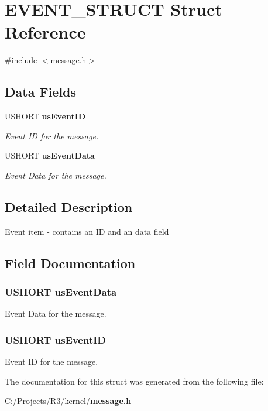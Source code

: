 \section{EVENT\_\-STRUCT Struct Reference}
\label{struct_e_v_e_n_t___s_t_r_u_c_t}


{\ttfamily \#include $<$message.h$>$}\subsection*{Data Fields}
\begin{DoxyCompactItemize}
\item 
USHORT {\bf usEventID}
\begin{DoxyCompactList}\small\item\em Event ID for the message. \item\end{DoxyCompactList}\item 
USHORT {\bf usEventData}
\begin{DoxyCompactList}\small\item\em Event Data for the message. \item\end{DoxyCompactList}\end{DoxyCompactItemize}


\subsection{Detailed Description}
Event item -\/ contains an ID and an data field 

\subsection{Field Documentation}
\subsubsection[{usEventData}]{\setlength{\rightskip}{0pt plus 5cm}USHORT {\bf usEventData}}\label{struct_e_v_e_n_t___s_t_r_u_c_t_a17e1b47a4cec01fd952ce8fca6153510}


Event Data for the message. 
\subsubsection[{usEventID}]{\setlength{\rightskip}{0pt plus 5cm}USHORT {\bf usEventID}}\label{struct_e_v_e_n_t___s_t_r_u_c_t_a31f5f42219a8b4c351cf16734572e0a4}


Event ID for the message. 

The documentation for this struct was generated from the following file:\begin{DoxyCompactItemize}
\item 
C:/Projects/R3/kernel/{\bf message.h}\end{DoxyCompactItemize}
